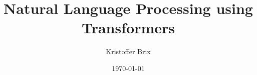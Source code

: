\title[Natural Language Processing using Transformers]{Natural Language Processing using Transformers}

\author[Kristoffer Brix]{Kristoffer Brix}

\vspace{-2cm}\date{\today}
